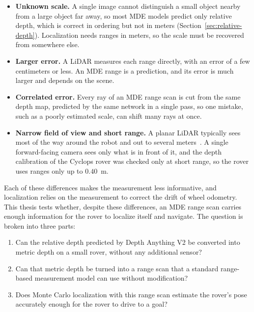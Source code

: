 \begin{itemize}
  \item \textbf{Unknown scale.} A single image cannot distinguish a small object nearby from a
  large object far away, so most MDE models predict only relative depth, which is correct in
  ordering but not in meters (Section~\ref{sec:relative-depth}). Localization needs ranges in
  meters, so the scale must be recovered from somewhere else.

  \item \textbf{Larger error.} A LiDAR measures each range directly, with an error of a few
  centimeters or less. An MDE range is a prediction, and its error is much larger and
  depends on the scene.

  \item \textbf{Correlated error.} Every ray of an MDE range scan is cut from the same depth map,
  predicted by the same network in a single pass, so one mistake, such as a poorly estimated
  scale, can shift many rays at once.

  \item \textbf{Narrow field of view and short range.} A planar LiDAR typically sees most of the way
  around the robot and out to several meters~\cite{kawata2005urg}. A single forward-facing camera sees only
  what is in front of it, and the depth calibration of the Cyclops rover was checked only at
  short range, so the rover uses ranges only up to $0.40$~m.
\end{itemize}

Each of these differences makes the measurement less informative, and localization relies on the
measurement to correct the drift of wheel odometry. This thesis tests whether, despite these
differences, an MDE range scan carries enough information for the rover to localize itself and
navigate. The question is broken into three parts:
\begin{enumerate}
  \item Can the relative depth predicted by Depth Anything V2 be converted into metric depth on a
  small rover, without any additional sensor?
  \item Can that metric depth be turned into a range scan that a standard range-based measurement
  model can use without modification?
  \item Does Monte Carlo localization with this range scan estimate the rover's pose accurately
  enough for the rover to drive to a goal?
\end{enumerate}

